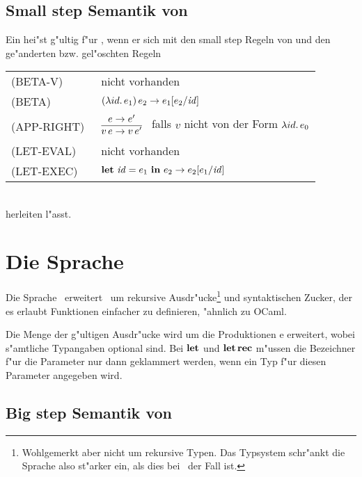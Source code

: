 \subsection{Small step Semantik von \LONECBN}

Ein  hei"st g"ultig f"ur \LONECBN, wenn er sich mit den small step Regeln von \LONE und den ge"anderten bzw. gel"oschten Regeln\\[5mm]
  \begin{tabular}{ll}
     \mbox{(BETA-V)}      & nicht vorhanden \\[3mm]
     \mbox{(BETA)}        & $(\lambda id.\,e_1)\,e_2 \to e_1[e_2/{\text{\it id\/}}]$ \\[5mm]
     \mbox{(APP-RIGHT)\ } & $\regel{e \to e'}
                                   {v\,e \to v\,e'}$   \ 
                                   falls ${v}$ nicht von der Form $\lambda id.\,e_0$ \\[5mm]
     \mbox{(LET-EVAL)\  } & nicht vorhanden \\[3mm]
     \mbox{(LET-EXEC)}    & $\textbf{let}\ {\text{\it id\/}} = e_1\ \textbf{in}\ e_2 \to e_2[e_1/{\text{\it id\/}}]$
  \end{tabular}\\[7mm]
herleiten l"asst.



\section{Die Sprache \LTWO}

Die Sprache \LTWO\ erweitert \LONE\ um rekursive Ausdr"ucke\footnote{Wohlgemerkt aber nicht um rekursive Typen. Das
Typsystem schr"ankt die Sprache also st"arker ein, als dies bei \LONE\ der Fall ist.} und syntaktischen Zucker, der
es erlaubt Funktionen einfacher zu definieren, "ahnlich zu OCaml.

Die Menge \notation{$\Exp$} der g"ultigen Ausdr"ucke wird um die Produktionen
\bgram
e \is {}
  \al {}
  \al {}
\egram
erweitert, wobei s"amtliche Typangaben optional sind. Bei $\textbf{let}$ und $\textbf{let}\,\textbf{rec}$ m"ussen die Bezeichner f"ur die
Parameter nur dann geklammert werden, wenn ein Typ f"ur diesen Parameter angegeben wird.


\subsection{Big step Semantik von \LTWO}

